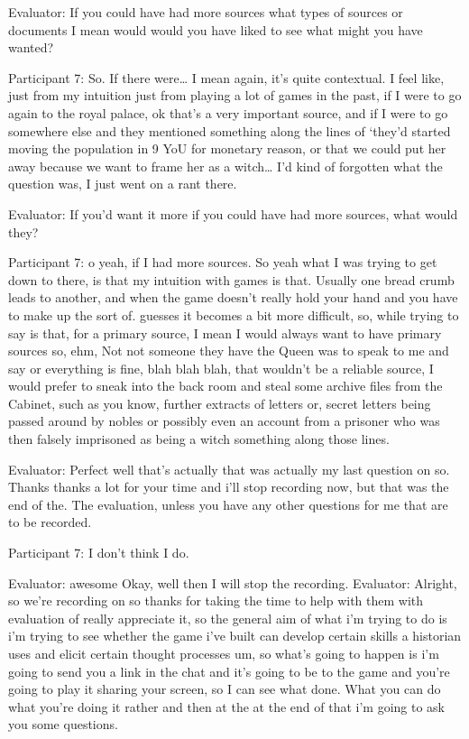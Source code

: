 \documentclass{l4proj}
\begin{document}
\begin{appendices}
Evaluator: If you could have had more sources what types of sources or documents I mean would would you have liked to see what might you have wanted?

Participant 7: So. If there were… I mean again, it’s quite contextual. I feel like, just from my intuition just from playing a lot of games in the past, if I were to go again to the royal palace, ok that’s a very important source, and if I were to go somewhere else and they mentioned something along the lines of ‘they’d started moving the population in 9 YoU for monetary reason, or that we could put her away because we want to frame her as a witch… I’d kind of forgotten what the question was, I just went on a rant there. 

Evaluator: If you'd want it more if you could have had more sources, what would they?

Participant 7: o yeah, if I had more sources. So yeah what I was trying to get down to there, is that my intuition with games is that. Usually one bread crumb leads to another, and when the game doesn't really hold your hand and you have to make up the sort of. guesses it becomes a bit more difficult, so, while trying to say is that, for a primary source, I mean I would always want to have primary sources so, ehm, Not not someone they have the Queen was to speak to me and say or everything is fine,  blah blah blah, that wouldn’t be a reliable source, I would prefer to sneak into the back room and steal some archive files from the Cabinet, such as you know, further extracts of letters or, secret letters being passed around by nobles or possibly even an account from a prisoner who was then falsely imprisoned as being a witch something along those lines.

Evaluator: Perfect well that's actually that was actually my last question on so. Thanks thanks a lot for your time and i'll stop recording now, but that was the end of the. The evaluation, unless you have any other questions for me that are to be recorded.

Participant 7: I don't think I do.

Evaluator: awesome Okay, well then I will stop the recording.
Evaluator: Alright, so we're recording on so thanks for taking the time to help with them with evaluation of really appreciate it, so the general aim of what i'm trying to do is i'm trying to see whether the game i've built can develop certain skills a  historian uses and elicit certain thought processes um, so what's going to happen is i'm going to send you a link in the chat and it's going to be to the game and you're going to play it sharing your screen, so I can see what done. What you can do what you're doing it rather and then at the at the end of that i'm going to ask you some questions.


\end{appendices}
\end{document}
